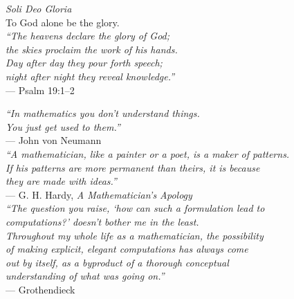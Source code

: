 \documentclass[11pt,twoside,openright]{book}
\theoremstyle{definition}
\begin{document}
\cleardoublepage

\thispagestyle{empty}
\vspace*{5cm}
\begin{center}
{\Large\itshape Soli Deo Gloria}\\[1cm]
{\normalsize To God alone be the glory.}\\[2cm]
{\small\itshape ``The heavens declare the glory of God;\\
the skies proclaim the work of his hands.\\
Day after day they pour forth speech;\\
night after night they reveal knowledge.''}\\[0.3cm]
{\small --- Psalm 19:1--2}
\end{center}
\vfill
\cleardoublepage

\thispagestyle{empty}
\vspace*{4cm}
\begin{center}
{\itshape ``In mathematics you don't understand things.\\
You just get used to them.''}\\[0.3cm]
{\small --- John von Neumann}\\[2cm]

{\itshape ``A mathematician, like a painter or a poet, is a maker of patterns.\\
If his patterns are more permanent than theirs, it is because\\
they are made with ideas.''}\\[0.3cm]
{\small --- G. H. Hardy, \emph{A Mathematician's Apology}}\\[2cm]

{\itshape ``The question you raise, `how can such a formulation lead to\\
computations?' doesn't bother me in the least.\\
Throughout my whole life as a mathematician, the possibility\\
of making explicit, elegant computations has always come\\
out by itself, as a byproduct of a thorough conceptual\\
understanding of what was going on.''}\\[0.3cm]
{\small --- Grothendieck}
\end{center}
\vfill
\cleardoublepage
\end{document}
